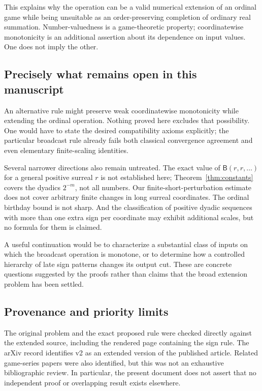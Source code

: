 \documentclass[11pt,letterpaper]{article}
\theoremstyle{definition}
\theoremstyle{remark}
\newcommand{\BB}{\mathsf B}
\begin{document}
This explains why the operation can be a valid numerical extension of an
ordinal game while being unsuitable as an order-preserving completion of
ordinary real summation. Number-valuedness is a game-theoretic property;
coordinatewise monotonicity is an additional assertion about its dependence on
input values. One does not imply the other.

\subsection{Precisely what remains open in this manuscript}

An alternative rule might preserve weak coordinatewise monotonicity while
extending the ordinal operation. Nothing proved here excludes that possibility.
One would have to state the desired compatibility axioms explicitly; the
particular broadcast rule already fails both classical convergence agreement
and even elementary finite-scaling identities.

Several narrower directions also remain untreated. The exact value of
$\BB(r,r,\ldots)$ for a general positive surreal $r$ is not established here;
Theorem~\ref{thm:constants} covers the dyadics $2^{-m}$, not all numbers.
Our finite-short-perturbation estimate does not cover arbitrary finite changes
in long surreal coordinates. The ordinal birthday bound is not sharp. And the
classification of positive dyadic sequences with more than one extra sign per
coordinate may exhibit additional scales, but no formula for them is claimed.

A useful continuation would be to characterize a substantial class of inputs
on which the broadcast operation is monotone, or to determine how a controlled
hierarchy of late sign patterns changes its output cut. These are concrete
questions suggested by the proofs rather than claims that the broad extension
problem has been settled.

\subsection{Provenance and priority limits}

The original problem and the exact proposed rule were checked directly against
the extended source, including the rendered page containing the sign rule.
The arXiv record identifies v2 as an extended version of the published article.
Related game-series papers were also identified, but this was not an exhaustive
bibliographic review. In particular, the present document does not assert that
no independent proof or overlapping result exists elsewhere.
\end{document}
